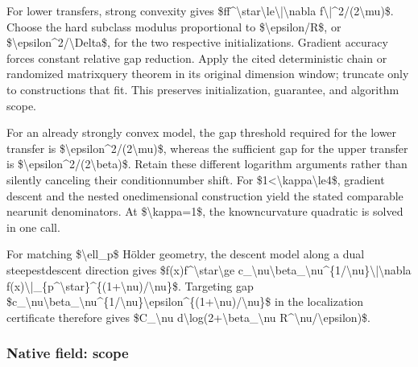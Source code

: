 \documentclass[10pt,a4paper]{article}
\begin{document}
For lower transfers, strong convexity gives \$ff\textasciicircum{}\textbackslash{}star\textbackslash{}le\textbackslash{}|\textbackslash{}nabla f\textbackslash{}|\textasciicircum{}2/(2\textbackslash{}mu)\$. Choose the hard subclass modulus proportional to \$\textbackslash{}epsilon/R\$, or \$\textbackslash{}epsilon\textasciicircum{}2/\textbackslash{}Delta\$, for the two respective initializations. Gradient accuracy forces constant relative gap reduction. Apply the cited deterministic chain or randomized matrixquery theorem in its original dimension window; truncate only to constructions that fit. This preserves initialization, guarantee, and algorithm scope.

For an already strongly convex model, the gap threshold required for the lower transfer is \$\textbackslash{}epsilon\textasciicircum{}2/(2\textbackslash{}mu)\$, whereas the sufficient gap for the upper transfer is \$\textbackslash{}epsilon\textasciicircum{}2/(2\textbackslash{}beta)\$. Retain these different logarithm arguments rather than silently canceling their conditionnumber shift. For \$1<\textbackslash{}kappa\textbackslash{}le4\$, gradient descent and the nested onedimensional construction yield the stated comparable nearunit denominators. At \$\textbackslash{}kappa=1\$, the knowncurvature quadratic is solved in one call.

For matching \$\textbackslash{}ell\_p\$ Hölder geometry, the descent model along a dual steepestdescent direction gives
\$f(x)f\textasciicircum{}\textbackslash{}star\textbackslash{}ge c\_\textbackslash{}nu\textbackslash{}beta\_\textbackslash{}nu\textasciicircum{}\{1/\textbackslash{}nu\}\textbackslash{}|\textbackslash{}nabla f(x)\textbackslash{}|\_\{p\textasciicircum{}\textbackslash{}star\}\textasciicircum{}\{(1+\textbackslash{}nu)/\textbackslash{}nu\}\$.
Targeting gap \$c\_\textbackslash{}nu\textbackslash{}beta\_\textbackslash{}nu\textasciicircum{}\{1/\textbackslash{}nu\}\allowbreak{}\textbackslash{}epsilon\textasciicircum{}\{(1+\textbackslash{}nu)/\textbackslash{}nu\}\$ in the localization certificate therefore gives
\$C\_\textbackslash{}nu d\textbackslash{}log(2+\textbackslash{}beta\_\textbackslash{}nu R\textasciicircum{}\textbackslash{}nu/\textbackslash{}epsilon)\$.


\subsubsection{Native field: scope}
\end{document}
